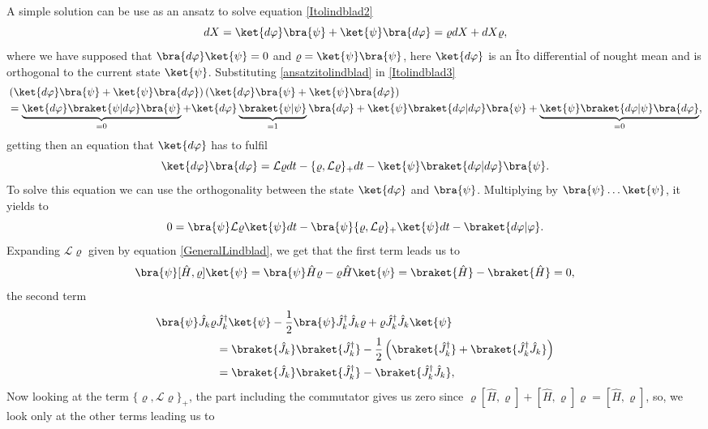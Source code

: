 A simple solution can be use as an ansatz to solve equation \eqref{Itolindblad2}
\begin{equation}
dX=\ket{d\varphi}\bra{\psi}+\ket{\psi}\bra{d\varphi}=\varrho dX+dX \varrho,
\label{ansatzitolindblad}
\end{equation}
where we have supposed that $\bra{d\varphi}\ket{\psi}=0$ and $\varrho=\ket{\psi}\bra{\psi}$, here $\ket{d\varphi}$ is an Îto differential of nought mean and is orthogonal to the current state $\ket{\psi}$.
Substituting \eqref{ansatzitolindblad} in \eqref{Itolindblad3}
\begin{align*}
&\left(\ket{d\varphi}\bra{\psi}+\ket{\psi}\bra{d\varphi}\right)\left(\ket{d\varphi}\bra{\psi}+\ket{\psi}\bra{d\varphi}\right)\\
&=\underbrace{\ket{d\varphi}\braket{\psi|d\varphi}\bra{\psi}}_{=0}+\ket{d\varphi}\underbrace{\braket{\psi|\psi}}_{=1}\bra{d\varphi}+\ket{\psi}\braket{d\varphi|d\varphi}\bra{\psi}+\underbrace{\ket{\psi}\braket{d\varphi|\psi}\bra{d\varphi}}_{=0},
\end{align*}
getting then an equation that $\ket{d\varphi}$ has to fulfil 
\begin{equation}
\ket{d\varphi}\bra{d\varphi}=\mathcal{L}\varrho dt-\{\varrho,\mathcal{L}\varrho\}_{+}dt-\ket{\psi}\braket{d\varphi|d\varphi}\bra{\psi}.
\end{equation}
To solve this equation we can use the orthogonality between the state $\ket{d\varphi}$ and $\bra{\psi}$. Multiplying by $\bra{\psi}\ldots\ket{\psi}$, it yields to
\[0=\bra{\psi}\mathcal{L}\varrho\ket{\psi}dt-\bra{\psi}\{\varrho,\mathcal{L}\varrho\}_{+}\ket{\psi}dt-\braket{d\varphi|\varphi}.\]
Expanding $\mathcal{L}\varrho$ given by equation \eqref{GeneralLindblad}, we get that the first term leads  us to
\[\bra{\psi}[\hat{H},\varrho]\ket{\psi}=\bra{\psi}\hat{H}\varrho-\varrho\hat{H}\ket{\psi}=\braket{\hat{H}}-\braket{\hat{H}}=0,\]
the second term
\begin{align*}
\bra{\psi}\hat{J}_k\varrho &\hat{J}_k^{\dagger}\ket{\psi}-\frac{1}{2}\bra{\psi}\hat{J}_k^{\dagger}\hat{J}_{k}\varrho+\varrho\hat{J}_k^{\dagger}\hat{J}_k\ket{\psi}\\
&=\braket{\hat{J}_k}\braket{\hat{J}_{k}^{\dagger}}-\frac{1}{2}\left(\braket{\hat{J}_k^{\dagger}}+\braket{\hat{J}_k^{\dagger}\hat{J}_k}\right)\\
&=\braket{\hat{J}_k}\braket{\hat{J}_{k}^{\dagger}}-\braket{\hat{J}_k^{\dagger}\hat{J}_k},
\end{align*}
Now looking at the term $\{\varrho,\mathcal{L}\varrho\}_{+}$, the part including the commutator gives us zero since $\varrho[\hat{H},\varrho]+[\hat{H},\varrho]\varrho=[\hat{H},\varrho]$, so, we look only at the other terms leading us to
